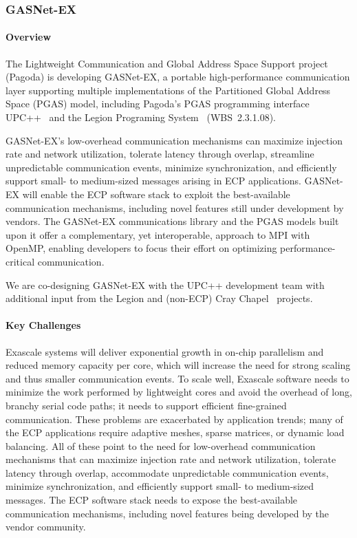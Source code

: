 \subsubsection{ GASNet-EX}
\paragraph{Overview} 

The Lightweight Communication and Global Address Space Support project (Pagoda)
is developing GASNet-EX, a portable high-performance communication layer
supporting multiple implementations of the Partitioned Global Address Space
(PGAS) model, including Pagoda's PGAS programming interface UPC++~\cite{Bachan:paw17}
 and the Legion Programing
System~\cite{bauer2012legion,legion-site} (WBS~2.3.1.08).

GASNet-EX's low-overhead communication mechanisms can maximize
injection rate and network utilization, tolerate latency through
overlap, streamline unpredictable communication events, minimize
synchronization, and efficiently support small- to medium-sized
messages arising in ECP applications.  GASNet-EX will enable the ECP
software stack to exploit the best-available communication mechanisms,
including novel features still under development by vendors.  The
GASNet-EX communications library and the PGAS models built upon it
offer a complementary, yet interoperable, approach to MPI with OpenMP,
enabling developers to focus their effort on optimizing
performance-critical communication.

We are co-designing GASNet-EX with the UPC++ development team with
additional input from the Legion and
(non-ECP) Cray Chapel~\cite{chapel-chapter,chapel-site} projects.

\paragraph{Key  Challenges}

Exascale systems will deliver exponential growth in on-chip parallelism and
reduced memory capacity per core, which will increase the need for strong
scaling and thus smaller communication events.  To scale well, Exascale
software needs to minimize the work performed by lightweight cores and avoid the
overhead of long, branchy serial code paths; it needs to support efficient
fine-grained communication.
These problems are exacerbated by application trends; many of the ECP applications require
adaptive meshes, sparse matrices,
or dynamic load balancing.
All of these point to the need for low-overhead communication mechanisms that
can maximize injection rate and network utilization, tolerate latency through
overlap, accommodate unpredictable communication events, minimize synchronization,
and efficiently support small- to medium-sized messages. The ECP software stack
needs to expose the best-available communication mechanisms, including novel
features being developed by the vendor community.

